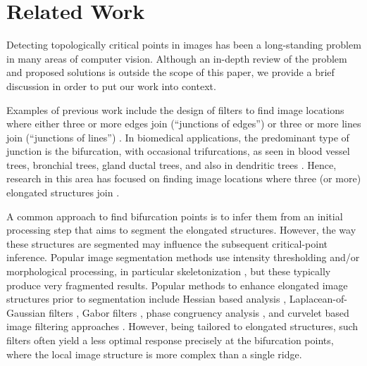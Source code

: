 \documentclass[twocolumn,natbib]{svjour3}
\newcommand{\marked}[1]{\textcolor{red}{#1}}
\begin{document}
\section{Related Work}
\label{sec:related_work}
Detecting topologically critical points in images has been a long-standing problem in many areas of computer vision. Although an in-depth review of the problem and proposed solutions is outside the scope of this paper, we provide a brief discussion in order to put our work into context.

Examples of previous work include the design of filters to find image locations where either three or more edges join (``junctions of edges'') \citep{sinzinger2008model, Hansen-2004, laganiere2004detection} or three or more lines join (``junctions of lines'') \citep{yu1998rotated, deschenes2000detection}. In biomedical applications, the predominant type of junction is the bifurcation, with occasional trifurcations, as seen in blood vessel trees, bronchial trees, gland ductal trees, and also in dendritic trees \citep{Koene-2009, Iber-2013}. Hence, research in this area has focused on finding image locations where three (or more) elongated structures join \citep{tsai2004model, agam2005vessel, bevilacqua2005combined, bhuiyan2007automatic, zhou2007vascular, aibinu2010vascular, calvo2011automatic, obaraa2012contrast, su2012junction, azzopardi2013automatic}.

A common approach to find bifurcation points is to infer them from an initial processing step that aims to segment the elongated structures. However, the way these structures are segmented may influence the subsequent critical-point inference. Popular image segmentation methods use intensity thresholding and/or morphological processing, in particular skeletonization \citep{hoover2000locating, Dima-2002, He-2003, Weaver-2004, pool2008neuritetracer, bevilacqua2009comparison, Leandro-2009, aibinu2010vascular}, but these typically produce very fragmented results. Popular methods to enhance elongated image structures prior to segmentation include Hessian based analysis \marked{\citep{frangi1998multiscale, xiong2006automated, zhang2007automated, al2008improved, Yuan-2009, turetken2011automated, Myatt-2012, Basu-2013,santamaria2015automatic}}, Lapla\-cean-of-Gaussian filters \citep{chothani2011automated}, Gabor filters \citep{bhuiyan2007automatic,azzopardi2013automatic}, phase congruency analysis \citep{obara2012contrast}, and curvelet based image filtering approaches \citep{Narayanaswamy-2011}. However, being tailored to elongated structures, such filters often yield a less optimal response precisely at the bifurcation points, where the local image structure is more complex than a single ridge. 
\end{document}

